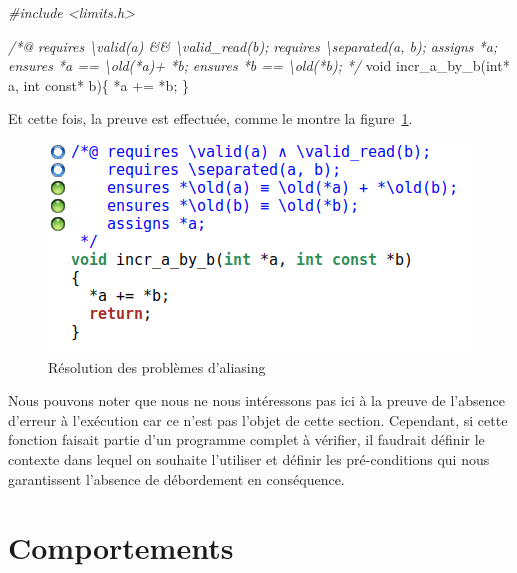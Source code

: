 \documentclass[12pt,francais,]{scrbook}
\newenvironment{Shaded}{}{}
\newcommand{\DataTypeTok}[1]{\textcolor[rgb]{0.56,0.13,0.00}{{#1}}}
\newcommand{\CommentTok}[1]{\textcolor[rgb]{0.38,0.63,0.69}{\textit{{#1}}}}
\newcommand{\NormalTok}[1]{{#1}}
\begin{document}
\begin{footnotesize}\begin{Shaded}
\begin{Highlighting}[]
\CommentTok{#include <limits.h>}

\CommentTok{/*@}
\CommentTok{  requires \textbackslash{}valid(a) && \textbackslash{}valid_read(b);}
\CommentTok{  requires \textbackslash{}separated(a, b);}
\CommentTok{  assigns  *a;}
\CommentTok{  ensures  *a == \textbackslash{}old(*a)+ *b;}
\CommentTok{  ensures  *b == \textbackslash{}old(*b);}
\CommentTok{*/}
\DataTypeTok{void} \NormalTok{incr_a_by_b(}\DataTypeTok{int}\NormalTok{* a, }\DataTypeTok{int} \DataTypeTok{const}\NormalTok{* b)\{}
  \NormalTok{*a += *b;}
\NormalTok{\}}
\end{Highlighting}
\end{Shaded}\end{footnotesize}

Et cette fois, la preuve est effectuée, comme le montre la
figure~\ref{fig:2-2-2-incr_a_by_b-2}.

\begin{figure}[htbp]
\centering
\includegraphics[scale=0.5]{2-2-2-incr_a_by_b-2.png}
\caption{Résolution des problèmes d'aliasing}
\label{fig:2-2-2-incr_a_by_b-2}
\end{figure}

Nous pouvons noter que nous ne nous intéressons pas ici à la preuve de
l'absence d'erreur à l'exécution car ce n'est pas l'objet de cette
section. Cependant, si cette fonction faisait partie d'un programme
complet à vérifier, il faudrait définir le contexte dans lequel on
souhaite l'utiliser et définir les pré-conditions qui nous garantissent
l'absence de débordement en conséquence.

\section{Comportements}\label{comportements}
\end{document}
